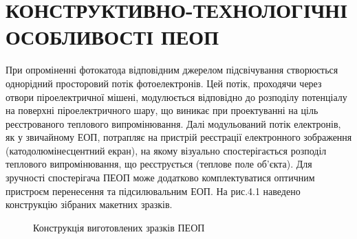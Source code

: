 \documentclass[a4paper,14pt]{extreport}
\begin{document}
\chapter{КОНСТРУКТИВНО-ТЕХНОЛОГІЧНІ ОСОБЛИВОСТІ ПЕОП}\par



При опроміненні фотокатода відповідним джерелом підсвічування створюється однорідний просторовий потік фотоелектронів. Цей потік, проходячи через отвори піроелектричної мішені, модулюється відповідно до розподілу потенціалу на
поверхні піроелектричного шару, що виникає при проектуванні на ціль реєстрованого теплового випромінювання. Далі
модульований потік електронів, як у звичайному ЕОП, потрапляє
на пристрій реєстрації електронного зображення (катодолюмінесцентний екран), на якому візуально спостерігається розподіл теплового випромінювання, що реєструється (теплове поле об'єкта).
Для зручності спостерігача ПЕОП може додатково комплектуватися оптичним пристроєм перенесення та підсилювальним ЕОП.
На рис.4.1 наведено конструкцію зібраних макетних зразків.



\begin{figure}[h!]

\caption{Конструкція виготовлених зразків ПЕОП}
\label{ris2}
\end{figure}
\end{document}

